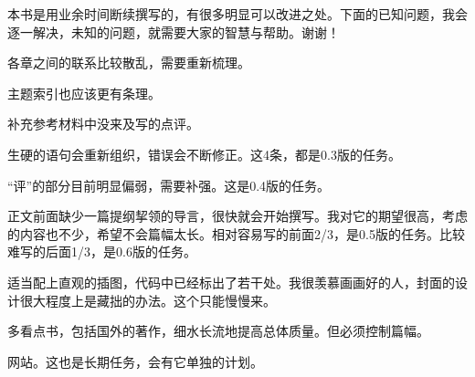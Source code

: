 本书是用业余时间断续撰写的，有很多明显可以改进之处。下面的已知问题，我会逐一解决，未知的问题，就需要大家的智慧与帮助。谢谢！
\begin{lyitemize}
\item 各章之间的联系比较散乱，需要重新梳理。
\item 主题索引也应该更有条理。
\item 补充参考材料中没来及写的点评。
\item 生硬的语句会重新组织，错误会不断修正。这4条，都是0.3版的任务。
\item “评”的部分目前明显偏弱，需要补强。这是0.4版的任务。
\item 正文前面缺少一篇提纲挈领的导言，很快就会开始撰写。我对它的期望很高，考虑的内容也不少，希望不会篇幅太长。相对容易写的前面2/3，是0.5版的任务。比较难写的后面1/3，是0.6版的任务。
\item 适当配上直观的插图，代码中已经标出了若干处。我很羡慕画画好的人，封面的设计很大程度上是藏拙的办法。这个只能慢慢来。
\item 多看点书，包括国外的著作，细水长流地提高总体质量。但必须控制篇幅。
\item 网站。这也是长期任务，会有它单独的计划。
\end{lyitemize}
